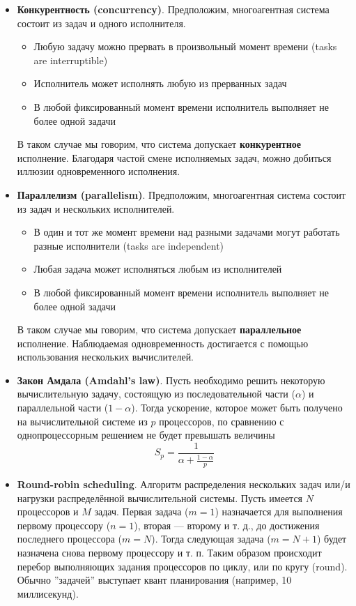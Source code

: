 \documentclass[a4paper, 12pt]{extarticle}
\begin{document}
\begin{itemize}
	\item \textbf{Конкурентность (concurrency)}. Предположим, многоагентная система состоит из задач и одного исполнителя.
	\begin{itemize}
		\item Любую задачу можно прервать в произвольный момент времени (tasks are interruptible)
		\item Исполнитель может исполнять любую из прерванных задач
		\item В любой фиксированный момент времени исполнитель выполняет не более одной задачи
	\end{itemize}
	В таком случае мы говорим, что система допускает \textbf{конкурентное} исполнение. Благодаря частой смене исполняемых задач, можно добиться иллюзии одновременного исполнения.

	\item \textbf{Параллелизм (parallelism)}. Предположим, многоагентная система состоит из задач и нескольких исполнителей.
	\begin{itemize}
		\item В один и тот же момент времени над разными задачами могут работать разные исполнители (tasks are independent)
		\item Любая задача может исполняться любым из исполнителей
		\item В любой фиксированный момент времени исполнитель выполняет не более одной задачи		
	\end{itemize}
	В таком случае мы говорим, что система допускает \textbf{параллельное} исполнение. Наблюдаемая одновременность достигается с помощью использования нескольких вычислителей.

	\item \textbf{Закон Амдала (Amdahl's law)}. Пусть необходимо решить некоторую вычислительную задачу, состоящую из последовательной части ($\alpha$) и параллельной части ($1-\alpha$). Тогда ускорение, которое может быть получено на вычислительной системе из $p$ процессоров, по сравнению с однопроцессорным решением не будет превышать величины 
	$$S_p=\frac{1}{\alpha+\frac{1-\alpha}{p}}$$

	\item \textbf{Round-robin scheduling}. Алгоритм распределения нескольких задач или/и нагрузки распределённой вычислительной системы. Пусть имеется $N$ процессоров и $M$ задач. Первая задача ($m = 1$) назначается для выполнения первому процессору ($n = 1$), вторая — второму и т. д., до достижения последнего процессора ($m = N$). Тогда следующая задача ($m = N+1$) будет назначена снова первому процессору и т. п. Таким образом происходит перебор выполняющих задания процессоров по циклу, или по кругу (round). Обычно ''задачей'' выступает квант планирования (например, 10 миллисекунд).


\end{itemize}
\end{document}
